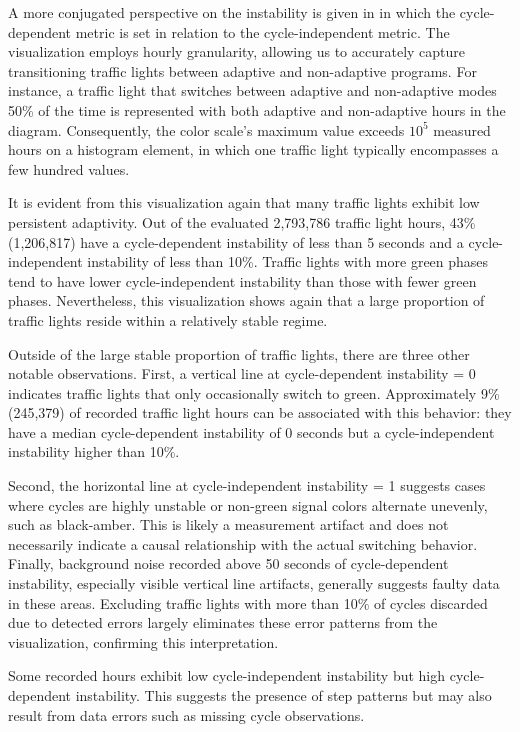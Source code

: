 A more conjugated perspective on the instability is given in  in which the cycle-dependent metric is set in relation to the cycle-independent metric. The visualization employs hourly granularity, allowing us to accurately capture transitioning traffic lights between adaptive and non-adaptive programs. For instance, a traffic light that switches between adaptive and non-adaptive modes 50\% of the time is represented with both adaptive and non-adaptive hours in the diagram. Consequently, the color scale's maximum value exceeds $10^5$ measured hours on a histogram element, in which one traffic light typically encompasses a few hundred values.

It is evident from this visualization again that many traffic lights exhibit low persistent adaptivity. Out of the evaluated 2,793,786 traffic light hours, 43\% (1,206,817) have a cycle-dependent instability of less than 5 seconds and a cycle-independent instability of less than 10\%. Traffic lights with more green phases tend to have lower cycle-independent instability than those with fewer green phases. Nevertheless, this visualization shows again that a large proportion of traffic lights reside within a relatively stable regime.

Outside of the large stable proportion of traffic lights, there are three other notable observations. First, a vertical line at cycle-dependent instability = 0 indicates traffic lights that only occasionally switch to green. Approximately 9\% (245,379) of recorded traffic light hours can be associated with this behavior: they have a median cycle-dependent instability of 0 seconds but a cycle-independent instability higher than 10\%. 

Second, the horizontal line at cycle-independent instability = 1 suggests cases where cycles are highly unstable or non-green signal colors alternate unevenly, such as black-amber. This is likely a measurement artifact and does not necessarily indicate a causal relationship with the actual switching behavior. Finally, background noise recorded above 50 seconds of cycle-dependent instability, especially visible vertical line artifacts, generally suggests faulty data in these areas. Excluding traffic lights with more than 10\% of cycles discarded due to detected errors largely eliminates these error patterns from the visualization, confirming this interpretation.

Some recorded hours exhibit low cycle-independent instability but high cycle-dependent instability. This suggests the presence of step patterns but may also result from data errors such as missing cycle observations.

